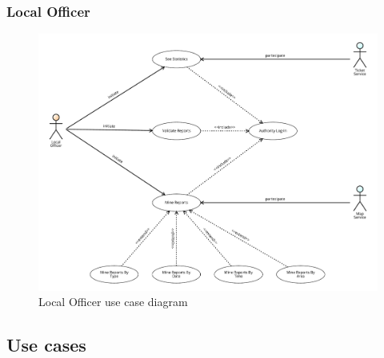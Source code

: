 				\subsubsection{Local Officer}
				\vspace{-7mm}
					\begin{figure}[!h]
						\centering
						\includegraphics[width=\textwidth]{images/UseCase/LO.pdf}
						\caption{Local Officer use case diagram}
					\end{figure}
			\clearpage
			\subsection{Use cases}
